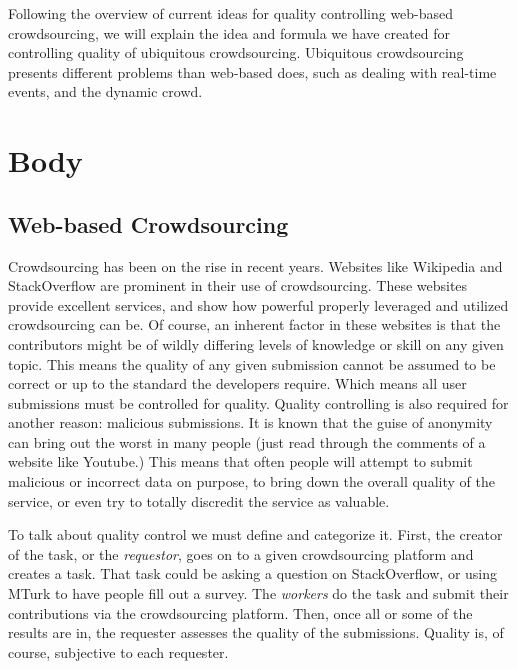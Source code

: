 \documentclass[9pt,twocolumn]{article}
\begin{document}
	Following the overview of current ideas for quality controlling web-based crowdsourcing, we will explain the idea and formula we have created for controlling quality of ubiquitous crowdsourcing. Ubiquitous crowdsourcing presents different problems than web-based does, such as dealing with real-time events, and the dynamic crowd. 
	
	\section*{Body}
	
	\subsection*{Web-based Crowdsourcing}
		
	Crowdsourcing has been on the rise in recent years. Websites like Wikipedia and StackOverflow are prominent in their use of crowdsourcing. These websites provide excellent services, and show how powerful properly leveraged and utilized crowdsourcing can be. Of course, an inherent factor in these websites is that the contributors might be of wildly differing levels of knowledge or skill on any given topic. This means the quality of any given submission cannot be assumed to be correct or up to the standard the developers require. Which means all user submissions must be controlled for quality. Quality controlling is also required for another reason: malicious submissions. It is known that the guise of anonymity can bring out the worst in many people (just read through the comments of a website like Youtube.) This means that often people will attempt to submit malicious or incorrect data on purpose, to bring down the overall quality of the service, or even try to totally discredit the service as valuable.
	
	To talk about quality control we must define and categorize it. First, the creator of the task, or the \emph{requestor}, goes on to a given crowdsourcing platform and creates a task. That task could be asking a question on StackOverflow, or using MTurk to have people fill out a survey. The \emph{workers} do the task and submit their contributions via the crowdsourcing platform. Then, once all or some of the results are in, the requester assesses the quality of the submissions. Quality is, of course, subjective to each requester. 
	
\end{document}
